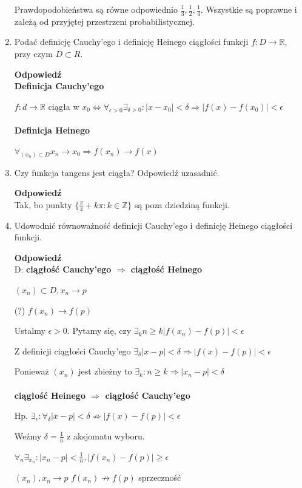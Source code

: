 \documentclass[12pt,a4paper]{article}
\theoremstyle{break}
\newcommand{\Odp}[1]{
		\begin{mdframed}[style=zadanie]
			\textbf{Odpowiedź}\\
			#1
		\end{mdframed}
	}
\begin{document}
\begin{enumerate}[1.]
{		Prawdopodobieństwa są równe odpowiednio $\frac{1}{3},\frac{1}{2},\frac{1}{4}$. Wszystkie są poprawne i zależą od przyjętej przestrzeni probabilistycznej.
	}
	
	\item Podać definicję Cauchy’ego i definicję Heinego ciągłości funkcji $f : D \rightarrow \mathbb{R}$, przy czym $D \subset R$.
	\Odp{
		\textbf{Definicja Cauchy'ego}
		
		$f:d\rightarrow \mathbb{R}$ ciągła w $x_0 \Leftrightarrow \forall_{\epsilon>0}\exists_{\delta>0}: |x-x_0|<\delta \Rightarrow |f(x)-f(x_0)|<\epsilon$\\\\
		
		\textbf{Definicja Heinego}
		
		$\forall_{(x_n)\subset D} x_n\rightarrow x_0 \Rightarrow f(x_n)\rightarrow f(x)$
		
		
	}
	
	\item Czy funkcja tangens jest ciągła? Odpowiedź uzasadnić.
	\Odp{
		Tak, bo punkty $\{\frac{\pi}{4}+k\pi:k\in\mathbb{Z}\}$ są poza dziedziną funkcji.
	}
	\newpage
	\item Udowodnić równoważność definicji Cauchy’ego i definicję Heinego ciągłości funkcji.
	\Odp{
		D: \textbf{ciągłość Cauchy'ego $\Rightarrow$ ciągłość Heinego}
		
		$(x_n)\subset D, x_n \rightarrow p$
		
		(?) $f(x_n)\rightarrow f(p)$
		
		Ustalmy $\epsilon>0$. Pytamy się, czy $\exists_k n\geq k |f(x_n)-f(p)|<\epsilon$
		
		Z definicji ciągłości Cauchy'ego $\exists_{\delta} |x-p|<
		\delta \Rightarrow |f(x)-f(p)|<\epsilon$
		
		Ponieważ $(x_n)$ jest zbieżny to $\exists_k : n\geq k \Rightarrow |x_n-p|<\delta$\\\\
		
		\textbf{ciągłość Heinego $\Rightarrow$ ciągłość Cauchy'ego}
		
		Hp. $\exists_\epsilon : \forall_\delta |x-p|<\delta \not\Rightarrow |f(x)-f(p)|<\epsilon$
		
		Weźmy $\delta = \frac{1}{n}$ z aksjomatu wyboru.
		
		$\forall_{n} \exists_{x_n} : |x_n-p|<\frac{1}{n}, |f(x_n)-f(p)|\geq \epsilon$
		
		$(x_n),x_n\rightarrow p$ $f(x_n)\not\rightarrow f(p)$ sprzeczność
	}
	

\end{enumerate}
\end{document}
